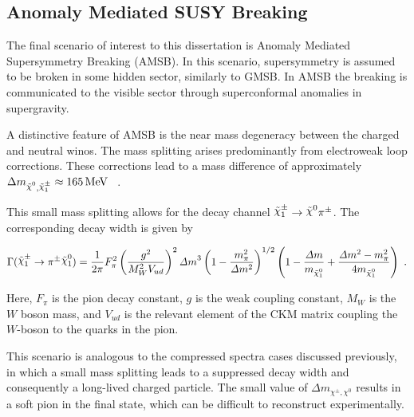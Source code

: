 \subsection{Anomaly Mediated SUSY Breaking}


The final scenario of interest to this dissertation is Anomaly Mediated Supersymmetry Breaking (AMSB). In this scenario, supersymmetry is assumed to be broken in some hidden sector, similarly to GMSB. In AMSB the breaking is communicated to the visible sector through superconformal anomalies in supergravity. 

A distinctive feature of AMSB is the near mass degeneracy between the charged and neutral winos. The mass splitting arises predominantly from electroweak loop corrections. 
These corrections lead to a mass difference of approximately $\Delta m_{\nino, \chinoonepm} \approx 165\, \MeV$ ~\cite{Ibe_2013}.


This small mass splitting allows for the decay channel $\chinoonepm \to \nino \pi^\pm$. The corresponding decay width is given by~\cite{Ibe_2023}


\begin{align}
    \Gamma(\chinoonepm \to \pi^\pm \ninoone)=\frac{1}{2\pi} F_\pi^2 \left(\frac{g^2 }{M^2_W V_{ud}}\right)^2 {\mathit{\Delta} m}^3\left(1- \frac{m_\pi^2}{\mathit{\Delta} m^2}\right)^{1/2} \left(1-\frac{\mathit{\Delta}m}{m_{\ninoone}}+\frac{\mathit{\Delta}m^2 - m_\pi^2}{4m_{\ninoone}}\right) \ .
\end{align}

Here, $F_\pi$ is the pion decay constant, $g$ is the weak coupling constant, $M_W$ is the $W$ boson mass, and $V_{ud}$ is the relevant element of the CKM matrix coupling the $W$-boson to the quarks in the pion.

This scenario is analogous to the compressed spectra cases discussed previously, in which a small mass splitting leads to a suppressed decay width and consequently a long-lived charged particle. The small value of $\Delta m_{\chi^\pm, \chi^0}$ results in a soft pion in the final state, which can be difficult to reconstruct experimentally.

